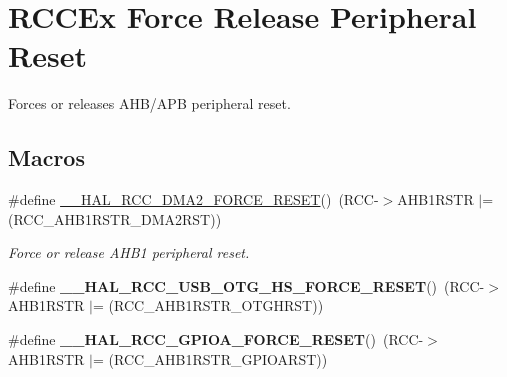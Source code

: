 \hypertarget{group___r_c_c_ex___force___release___peripheral___reset}{}\section{R\+C\+C\+Ex Force Release Peripheral Reset}
\label{group___r_c_c_ex___force___release___peripheral___reset}


Forces or releases A\+H\+B/\+A\+PB peripheral reset.  


\subsection*{Macros}
\begin{DoxyCompactItemize}
\item 
\mbox{\label{group___r_c_c_ex___force___release___peripheral___reset_gaf0be736e6cdebf31eeded223acc25613}} 
\#define \mbox{\hyperlink{group___r_c_c_ex___force___release___peripheral___reset_gaf0be736e6cdebf31eeded223acc25613}{\+\_\+\+\_\+\+H\+A\+L\+\_\+\+R\+C\+C\+\_\+\+D\+M\+A2\+\_\+\+F\+O\+R\+C\+E\+\_\+\+R\+E\+S\+ET}}()~(R\+CC-\/$>$A\+H\+B1\+R\+S\+TR $\vert$= (R\+C\+C\+\_\+\+A\+H\+B1\+R\+S\+T\+R\+\_\+\+D\+M\+A2\+R\+ST))
\begin{DoxyCompactList}\small\item\em Force or release A\+H\+B1 peripheral reset. \end{DoxyCompactList}\item 
\mbox{\label{group___r_c_c_ex___force___release___peripheral___reset_gabae5d5cc27063a2a963a69c131b426c5}} 
\#define {\bfseries \+\_\+\+\_\+\+H\+A\+L\+\_\+\+R\+C\+C\+\_\+\+U\+S\+B\+\_\+\+O\+T\+G\+\_\+\+H\+S\+\_\+\+F\+O\+R\+C\+E\+\_\+\+R\+E\+S\+ET}()~(R\+CC-\/$>$A\+H\+B1\+R\+S\+TR $\vert$= (R\+C\+C\+\_\+\+A\+H\+B1\+R\+S\+T\+R\+\_\+\+O\+T\+G\+H\+R\+ST))
\item 
\mbox{\label{group___r_c_c_ex___force___release___peripheral___reset_gab329bd497cccffd979bcca9fd42bbc79}} 
\#define {\bfseries \+\_\+\+\_\+\+H\+A\+L\+\_\+\+R\+C\+C\+\_\+\+G\+P\+I\+O\+A\+\_\+\+F\+O\+R\+C\+E\+\_\+\+R\+E\+S\+ET}()~(R\+CC-\/$>$A\+H\+B1\+R\+S\+TR $\vert$= (R\+C\+C\+\_\+\+A\+H\+B1\+R\+S\+T\+R\+\_\+\+G\+P\+I\+O\+A\+R\+ST))

\end{DoxyCompactItemize}
